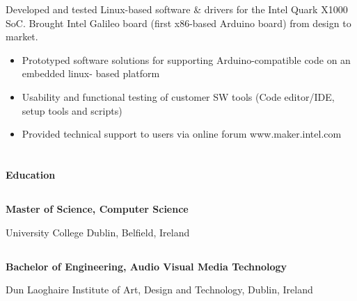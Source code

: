 \documentclass[6pt]{article}
\begin{document}
\begin{minipage}{50em}
\begin{minipage}{14em}
{}
\end{minipage}
\break
\break
Developed and tested Linux-based software \& drivers for the Intel Quark X1000 SoC. Brought Intel
Galileo board (first x86-based Arduino board) from design to market.
\begin{itemize}
    \item Prototyped software solutions for supporting Arduino-compatible code on an embedded linux-
          based platform
    \item Usability and functional testing of customer SW tools (Code editor/IDE, setup tools and scripts)
    \item Provided technical support to users via online forum www.maker.intel.com
\end{itemize}

\section*{}
{\Large \bfseries Education}
\subsection*{}
{\bfseries Master of Science, Computer Science}

University College Dublin, Belfield, Ireland
\subsection*{}
{\bfseries Bachelor of Engineering, Audio Visual Media Technology}

Dun Laoghaire Institute of Art, Design and Technology, Dublin, Ireland

\end{minipage}
\end{document}
